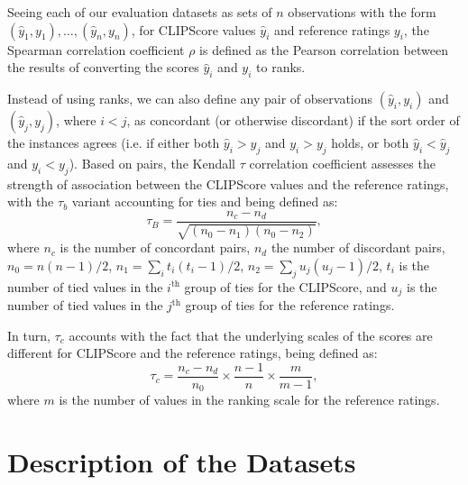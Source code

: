 Seeing each of our evaluation datasets as sets of $n$ observations with the form $(\hat{y}_1,y_1), \ldots, (\hat{y}_n,y_n)$, for CLIPScore values $\hat{y}_i$ and reference ratings $y_i$, the Spearman correlation coefficient $\rho$ is defined as the Pearson correlation between the results of converting the scores $\hat{y}_i$ and $y_i$ to ranks. 

Instead of using ranks, we can also define any pair of observations $(\hat{y}_{i},y_{i})$ and $(\hat{y}_{j},y_{j})$, where $i < j$, as concordant (or otherwise discordant) if the sort order of the instances agrees (i.e. if either both $\hat{y}_{i} > \hat{y}_{j}$ and $y_{i} > y_{j}$ holds, or both $\hat{y}_{i} < \hat{y}_{j}$ and $y_{i} < y_{j}$). Based on pairs, the Kendall $\tau$ correlation coefficient assesses the strength of association between the CLIPScore values and the reference ratings, with the $\tau_b$ variant accounting for ties and being defined as:
\begin{equation}
\tau _{B}={\frac {n_{c}-n_{d}}{\sqrt {(n_{0}-n_{1})(n_{0}-n_{2})}}},
\end{equation}
where $n_{c}$ is the number of concordant pairs, $n_{d}$ the number of discordant pairs, $n_{0} = n(n-1)/2$, $n_{1} = \sum _{i}t_{i}(t_{i}-1)/2$, $n_{2} = \sum _{j}u_{j}(u_{j}-1)/2$, $t_{i}$ is the number of tied values in the $i^\text{th}$ group of ties for the CLIPScore, and  $u_{j}$ is the number of tied values in the $j^\text{th}$ group of ties for the reference ratings.

In turn, $\tau_c$ accounts with the fact that the underlying scales of the scores are different for CLIPScore and the reference ratings, being defined as:
\begin{equation}
\tau_{c}={\frac {n_{c}-n_{d}}{n_{0}}} \times {\frac {n-1}{n}} \times {\frac {m}{m-1}},
\end{equation}
where $m$ is the number of values in the ranking scale for the reference ratings.

\section{Description of the Datasets}\label{app:datasets}

